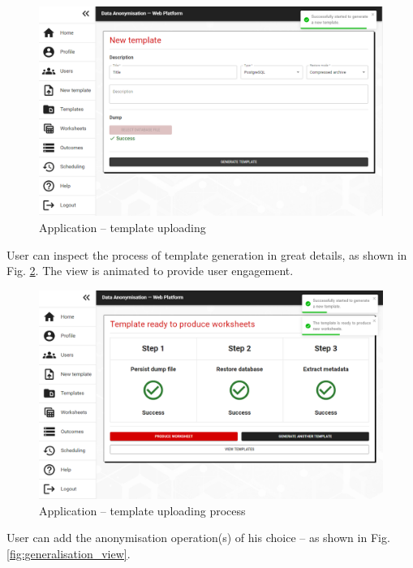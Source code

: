 \documentclass[a4paper,twoside,12pt]{book}
\begin{document}
\begin{figure}
  \centering
  \includegraphics[width=\linewidth]{img/app_template.png}
  \caption{Application -- template uploading}
  \label{fig:template_uploading_view}
\end{figure}



User can inspect the process of template generation in great details, as shown in Fig. \ref{fig:template_uploading_process}. The view is animated to provide user engagement.

\begin{figure}
  \centering
  \includegraphics[width=\linewidth]{img/app_template_ready.png}
  \caption{Application -- template uploading process}
  \label{fig:template_uploading_process}
\end{figure}


User can add the anonymisation operation(s) of his choice -- as shown in Fig. \ref{fig:generalisation_view}.
\end{document}
